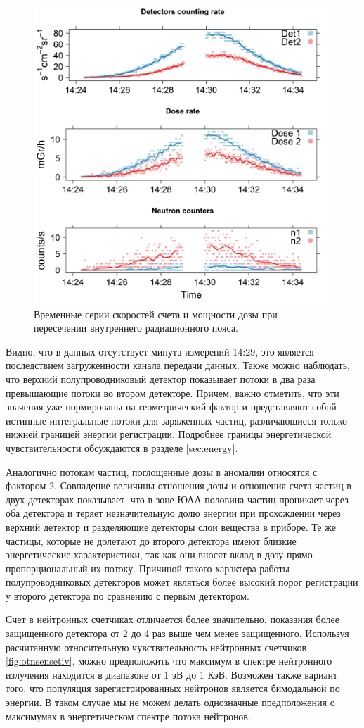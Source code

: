 \begin{figure}
	\centering
	\includegraphics[width=0.5\linewidth]{images/results/depron_sec_log_new08-29-1614-24-23}
	\caption{Временные серии скоростей счета и мощности дозы при пересечении внутреннего радиационного пояса. }	\label{fig:depronseclognew08-29-1614-24-23}
\end{figure}

Видно, что в данных отсутствует минута измерений 14:29, это является последствием загруженности канала передачи данных. Также можно наблюдать, что верхний полупроводниковый детектор показывает потоки в два раза превышающие потоки во втором детекторе. Причем, важно отметить, что эти значения уже нормированы на геометрический фактор и представляют собой истинные интегральные потоки для заряженных частиц, различающиеся только нижней границей энергии регистрации. Подробнее границы энергетической чувствительности обсуждаются в разделе \ref{sec:energy}.

Аналогично потокам частиц, поглощенные дозы в аномалии относятся с фактором 2. Совпадение  величины отношения дозы и отношения счета частиц в двух детекторах показывает, что в зоне ЮАА половина частиц проникает через оба детектора и теряет незначительную долю энергии при прохождении через верхний детектор и разделяющие детекторы слои вещества в приборе. Те же частицы, которые не долетают до второго детектора имеют близкие энергетические характеристики, так как они вносят вклад в дозу прямо пропорциональный их потоку. Причиной такого характера работы полупроводниковых детекторов может являться более высокий порог регистрации у второго детектора по сравнению с первым детектором.

Счет в нейтронных счетчиках отличается более значительно, показания более защищенного детектора от 2 до 4 раз выше чем менее защищенного. Используя расчитанную относительную чувствительность нейтронных счетчиков \ref{fig:otnsensetiv},  можно предположить что максимум в спектре нейтронного излучения находится в диапазоне от 1 эВ до 1 КэВ.  Возможен также вариант того, что популяция зарегистрированных нейтронов является бимодальной по энергии. В таком случае мы не можем делать однозначные предположения о максимумах в энергетическом спектре потока нейтронов.

